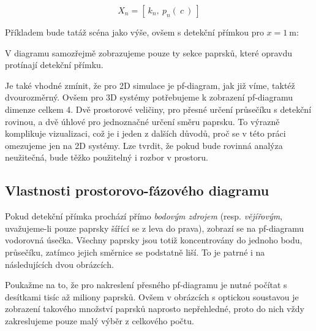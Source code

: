 \[ X_n = [\ k_n,\ p_n(\ c\ )\ ] \]

Příkladem bude tatáž scéna jako výše, ovšem s detekční přímkou pro $x = 1\ \mathrm{m}$:


V diagramu samozřejmě zobrazujeme pouze ty sekce paprsků, které opravdu protínají detekční přímku.

Je také vhodné zmínit, že pro 2D simulace je pf-diagram, jak již víme, taktéž dvourozměrný. Ovšem pro 3D systémy potřebujeme k zobrazení pf-diagramu dimenze celkem 4. Dvě prostorové veličiny, pro přesné určení průsečíku s detekční rovinou, a dvě úhlové pro jednoznačné určení směru paprsku. To výrazně komplikuje vizualizaci, což je i jeden z dalších důvodů, proč se v této práci omezujeme jen na 2D systémy. Lze tvrdit, že pokud bude rovinná analýza neužitečná, bude těžko použitelný i rozbor v prostoru.


\subsection{Vlastnosti prostorovo-fázového diagramu}
\label{sub:analyzasystemu_vlastnostipfdiagramu}

Pokud detekční přímka prochází přímo \emph{bodovým zdrojem} (resp. \emph{vějířovým}, uvažujeme-li pouze paprsky šířící se z leva do prava), zobrazí se na pf-diagramu vodorovná úsečka. Všechny paprsky jsou totiž koncentrovány do jednoho bodu, průsečíku, zatímco jejich směrnice se podstatně liší. To je patrné i na následujících dvou obrázcích.

Poukažme na to, že pro nakreslení přesného pf-diagramu je nutné počítat s desítkami tisíc až miliony paprsků. Ovšem v obrázcích s optickou soustavou je zobrazení takového množství paprsků naprosto nepřehledné, proto do nich vždy zakreslujeme pouze malý výběr z celkového počtu.


